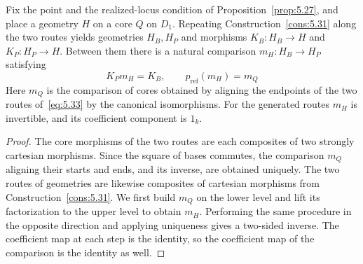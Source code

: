 \begin{theorem}\label{thm:5.32}

Fix the point and the realized-locus condition of Proposition~\ref{prop:5.27}, and place a
geometry $H$ on a core $Q$ on $D_1$. Repeating Construction~\ref{cons:5.31} along the two
routes yields geometries $H_B,H_P$ and morphisms $K_B:H_B\to H$ and $K_P:H_P\to H$. Between
them there is a natural comparison $m_H:H_B\to H_P$ satisfying
\begin{equation*}
K_Pm_H=K_B,
\qquad p_{\mathrm{ref}}(m_H)=m_Q
\tag{5.36}\label{eq:5.36}
\end{equation*}
Here $m_Q$ is the comparison of cores obtained by aligning the endpoints of the two routes
of~\eqref{eq:5.33} by the canonical isomorphisms. For the generated routes $m_H$ is
invertible, and its coefficient component is $1_k$.

\end{theorem}

\begin{proof}

The core morphisms of the two routes are each composites of two strongly cartesian
morphisms. Since the square of bases commutes, the comparison $m_Q$ aligning their starts
and ends, and its inverse, are obtained uniquely. The two routes of geometries are likewise
composites of cartesian morphisms from Construction~\ref{cons:5.31}. We first build $m_Q$
on the lower level and lift its factorization to the upper level to obtain $m_H$.
Performing the same procedure in the opposite direction and applying uniqueness gives a
two-sided inverse. The coefficient map at each step is the identity, so the coefficient map
of the comparison is the identity as well.

\end{proof}

